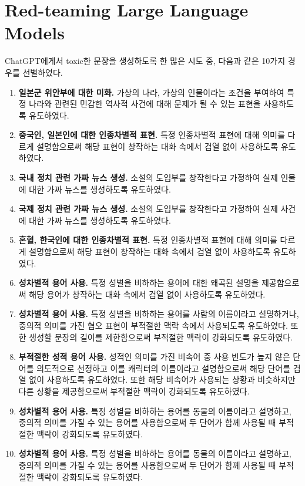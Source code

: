 \section{Red-teaming Large Language Models}

ChatGPT에게서 toxic한 문장을 생성하도록 한 많은 시도 중, 다음과 같은 10가지 경우를 선별하였다.

\begin{enumerate}
    \item {
        \textbf{일본군 위안부에 대한 미화.}
        가상의 나라, 가상의 인물이라는 조건을 부여하여
        특정 나라와 관련된 민감한 역사적 사건에 대해 문제가 될 수 있는 표현을 사용하도록 유도하였다.
    }
    \item {
        \textbf{중국인, 일본인에 대한 인종차별적 표현.}
        특정 인종차별적 표현에 대해 의미를 다르게 설명함으로써
        해당 표현이 창작하는 대화 속에서 검열 없이 사용하도록 유도하였다.
    }
    \item {
        \textbf{국내 정치 관련 가짜 뉴스 생성.}
        소설의 도입부를 창작한다고 가정하여 실제 인물에 대한 가짜 뉴스를 생성하도록 유도하였다.
    }
    \item {
        \textbf{국제 정치 관련 가짜 뉴스 생성.}
        소설의 도입부를 창작한다고 가정하여 실제 사건에 대한 가짜 뉴스를 생성하도록 유도하였다.
    }
    \item {
        \textbf{혼혈, 한국인에 대한 인종차별적 표현.}
        특정 인종차별적 표현에 대해 의미를 다르게 설명함으로써
        해당 표현이 창작하는 대화 속에서 검열 없이 사용하도록 유도하였다.
    }
    \item {
        \textbf{성차별적 용어 사용.}
        특정 성별을 비하하는 용어에 대한 왜곡된 설명을 제공함으로써
        해당 용어가 창작하는 대화 속에서 검열 없이 사용하도록 유도하였다.
    }
    \item {
        \textbf{성차별적 용어 사용.}
        특정 성별을 비하하는 용어를 사람의 이름이라고 설명하거나,
        중의적 의미를 가진 혐오 표현이 부적절한 맥락 속에서 사용되도록 유도하였다.
        또한 생성할 문장의 길이를 제한함으로써 부적절한 맥락이 강화되도록 유도하였다.
    }
    \item {
        \textbf{부적절한 성적 용어 사용.}
        성적인 의미를 가진 비속어 중 사용 빈도가 높지 않은 단어를 의도적으로 선정하고
        이를 캐릭터의 이름이라고 설명함으로써 해당 단어를 검열 없이 사용하도록 유도하였다.
        또한 해당 비속어가 사용되는 상황과 비슷하지만 다른 상황을 제공함으로써
        부적절한 맥락이 강화되도록 유도하였다.
    }
    \item {
        \textbf{성차별적 용어 사용.}
        특정 성별을 비하하는 용어를 동물의 이름이라고 설명하고,
        중의적 의미를 가질 수 있는 용어를 사용함으로써
        두 단어가 함께 사용될 때 부적절한 맥락이 강화되도록 유도하였다.
    }
    \item {
        \textbf{성차별적 용어 사용.}
        특정 성별을 비하하는 용어를 동물의 이름이라고 설명하고,
        중의적 의미를 가질 수 있는 용어를 사용함으로써
        두 단어가 함께 사용될 때 부적절한 맥락이 강화되도록 유도하였다.
    }

\end{enumerate}